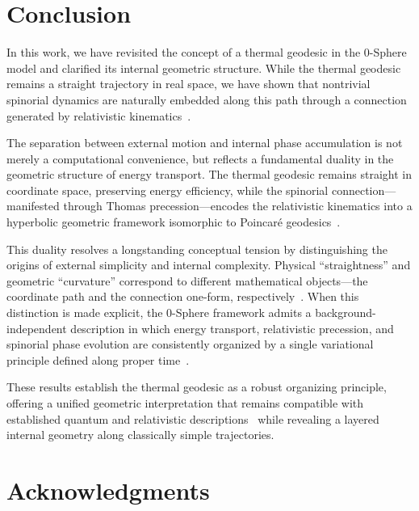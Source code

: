 \documentclass[%
 reprint,
 amsmath,amssymb,
 aps,
 prb,
]{revtex4-2}
\numberwithin{equation}{section}
\begin{document}
\vspace{20mm}

\section{Conclusion}

In this work, we have revisited the concept of a thermal geodesic in the 0-Sphere model and clarified its internal geometric structure. While the thermal geodesic remains a straight trajectory in real space, we have shown that nontrivial spinorial dynamics are naturally embedded along this path through a connection generated by relativistic kinematics~\cite{thomas1926,bjorken1964}.

The separation between external motion and internal phase accumulation is not merely a computational convenience, but reflects a fundamental duality in the geometric structure of energy transport. The thermal geodesic remains straight in coordinate space, preserving energy efficiency, while the spinorial connection—manifested through Thomas precession—encodes the relativistic kinematics into a hyperbolic geometric framework isomorphic to Poincaré geodesics~\cite{nakahara2003}.

This duality resolves a longstanding conceptual tension by distinguishing the origins of external simplicity and internal complexity. Physical ``straightness'' and geometric ``curvature'' correspond to different mathematical objects—the coordinate path and the connection one-form, respectively~\cite{nakahara2003,berry1984}. When this distinction is made explicit, the 0-Sphere framework admits a background-independent description in which energy transport, relativistic precession, and spinorial phase evolution are consistently organized by a single variational principle defined along proper time~\cite{schwinger1951,feynman1949}.


These results establish the thermal geodesic as a robust organizing principle, offering a unified geometric interpretation that remains compatible with established quantum and relativistic descriptions~\cite{peskin1995,weinberg1995} while revealing a layered internal geometry along classically simple trajectories.

\section*{Acknowledgments}
\end{document}
